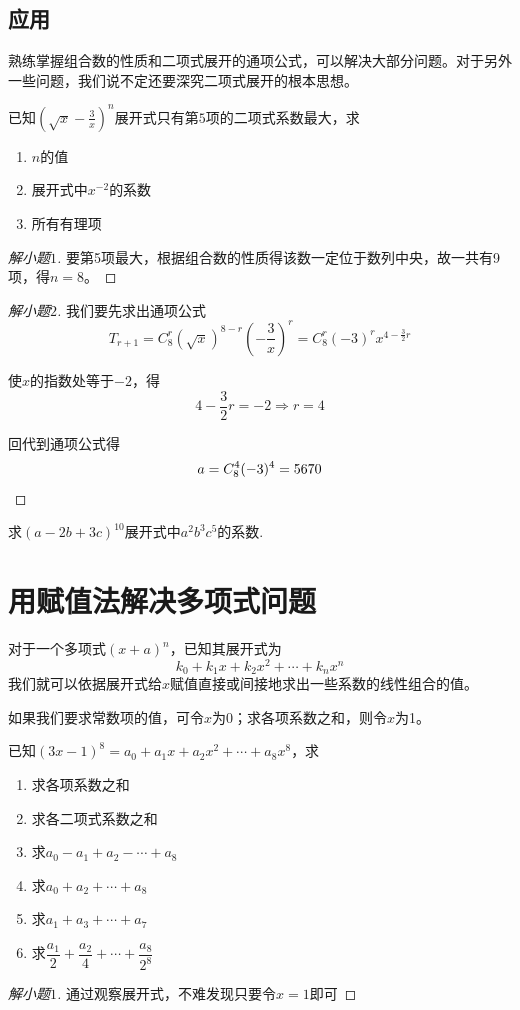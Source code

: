 \subsection{应用}
熟练掌握组合数的性质和二项式展开的通项公式，可以解决大部分问题。对于另外一些问题，我们说不定还要深究二项式展开的根本思想。

\begin{example}
	已知$(\sqrt{x}-\frac{3}{x})^n$展开式只有第$5$项的二项式系数最大，求

	\begin{enumerate}
		\item $n$的值
		\item 展开式中$x^{-2}$的系数
		\item 所有有理项
	\end{enumerate}
\end{example}

\begin{proof}[解小题$1$]
	要第5项最大，根据组合数的性质得该数一定位于数列中央，故一共有9项，得$n=8$。
\end{proof}

\begin{proof}[解小题$2$]
	我们要先求出通项公式\[T_{r+1}=C_8^r(\sqrt{x})^{8-r}(-\frac{3}{x})^r=C_8^r(-3)^rx^{4-\frac{3}{2}r}\]

	使$x$的指数处等于$-2$，得\[4-\frac{3}{2}r=-2\Rightarrow r=4\]

	回代到通项公式得\[a=C_8^4(-3)^4=5670\qedhere\]
\end{proof}

\begin{example}
	求$(a-2b+3c)^{10}$展开式中$a^2b^3c^5$的系数.
\end{example}

\section[多项式问题]{用赋值法解决多项式问题}
对于一个多项式$(x+a)^n$，已知其展开式为\[k_0+k_1x+k_2x^2+\cdots+k_nx^n\]我们就可以依据展开式给$x$赋值直接或间接地求出一些系数的线性组合的值。

如果我们要求常数项的值，可令$x$为0；求各项系数之和，则令$x$为1。

\begin{example}
	已知$(3x-1)^8=a_0+a_1x+a_2x^2+\cdots+a_8x^8$，求

	\begin{enumerate}
		\item 求各项系数之和
		\item 求各二项式系数之和
		\item 求$a_0-a_1+a_2-\cdots+a_8$
		\item 求$a_0+a_2+\cdots+a_8$
		\item 求$a_1+a_3+\cdots+a_7$
		\item 求$\dfrac{a_1}{2}+\dfrac{a_2}{4}+\cdots+\dfrac{a_8}{2^8}$
	\end{enumerate}
\end{example}

\begin{proof}[解小题$1$]
	通过观察展开式，不难发现只要令$x=1$即可
\end{proof}
